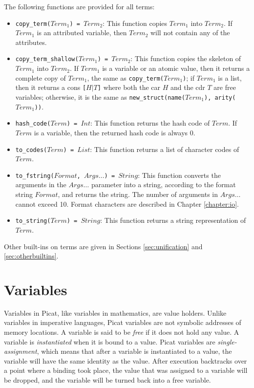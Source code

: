 \begin{table}
\caption{\label{tab:ops}Operators in Picat}

\end{table}

The following functions are provided for all terms:
\begin{itemize}
\item \texttt{copy\_term($Term_1$) = $Term_2$}: This function copies $Term_1$ into $Term_2$.  If $Term_1$ is an attributed variable, then $Term_2$ will not contain any of the attributes.
\item \texttt{copy\_term\_shallow($Term_1$) = $Term_2$}: This function copies the skeleton of $Term_1$ into $Term_2$. If $Term_1$ is a variable or an atomic value, then it returns a complete copy of $Term_1$, the same as \texttt{copy\_term($Term_1$)}; if $Term_1$ is a list, then it returns a cons \texttt{[$H$$|$$T$]} where both the car $H$ and the cdr $T$ are free variables; otherwise, it is the same as \texttt{new\_struct(name($Term_1$), arity($Term_1$))}.
\item \texttt{hash\_code($Term$) = $Int$}: This function returns the hash code of $Term$. If $Term$ is a variable, then the returned hash code is always 0.
\item \texttt{to\_codes($Term$) = $List$}: This function returns a list of character codes of $Term$.
\item \texttt{to\_fstring($Format$, $Args\ldots$) = $String$}: This function converts the arguments in the $Args\ldots$ parameter into a string, according to the format string $Format$, and returns the string. The number of arguments in $Args\ldots$ cannot exceed 10. Format characters are described in Chapter \ref{chapter:io}.
\item \texttt{to\_string($Term$) = $String$}: This function returns a string representation of $Term$.
\end{itemize}
Other built-ins on terms are given in Sections \ref{sec:unification} and \ref{sec:otherbuiltins}.

\section{Variables}
Variables in Picat, like variables in mathematics, are value holders. Unlike variables in imperative languages, Picat variables are not symbolic addresses of memory locations. A variable is said to be \emph{free} if it does not hold any value. A variable is \emph{instantiated} when it is bound to a value. Picat variables are \emph{single-assignment}, which means that after a variable is instantiated to a value, the variable will have the same identity as the value. After execution backtracks over a point where a binding took place, the value that was assigned to a variable will be dropped, and the variable will be turned back into a free variable.

